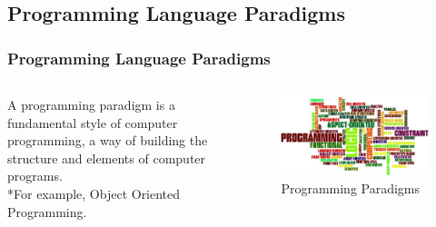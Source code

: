 \documentclass[hideothersubsections]{beamer}
\begin{document}
\subsection{Programming Language Paradigms}
\begin{frame}
\frametitle{Programming Language Paradigms}
  \begin{columns}[T]
    \begin{column}{.4\textwidth}
     \begin{block}{}
A programming paradigm is a fundamental style of computer programming, a way of building the structure and elements of computer programs.
\\*For example, Object Oriented Programming.
    \end{block}
    \end{column}
    \begin{column}{.6\textwidth}
    \begin{block}{}
\begin{figure}
    \includegraphics[width=1\textwidth]{programminglanguageparadigms.jpg} 
    \caption{Programming Paradigms}
 \end{figure}   
    \end{block}
    \end{column}
  \end{columns}
  \note[item]{}
\end{frame}
\end{document}
